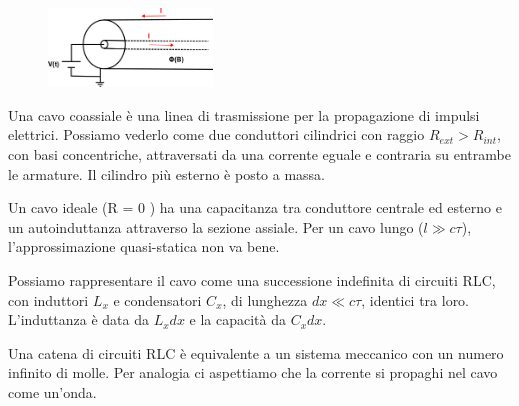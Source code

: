 \begin{figure} %
    \centering
    \includegraphics[width=0.39\textwidth]{images/coaxsial_cable} %
\end{figure}
Una cavo coassiale \`e una linea di trasmissione per la propagazione di impulsi elettrici. Possiamo vederlo come due conduttori cilindrici con raggio $R_{ext} > R_{int}$, con basi concentriche, attraversati da una corrente eguale e contraria su entrambe le armature. Il cilindro pi\`u esterno \`e posto a massa.

Un cavo ideale (R = 0 ) ha una capacitanza tra conduttore centrale ed esterno e un autoinduttanza attraverso la sezione assiale. Per un cavo lungo ($l \gg c \tau$), l'approssimazione quasi-statica non va bene.

Possiamo rappresentare il cavo come una successione indefinita di circuiti RLC, con induttori $L_x$ e condensatori $C_x$, di lunghezza $dx \ll c \tau$, identici tra loro. L'induttanza \`e data da $L_x dx$ e la capacit\`a da $C_xdx$.
\newline

Una catena di circuiti RLC \`e equivalente a un sistema meccanico con un numero infinito di molle. Per analogia ci aspettiamo che la corrente si propaghi nel cavo come un'onda.

